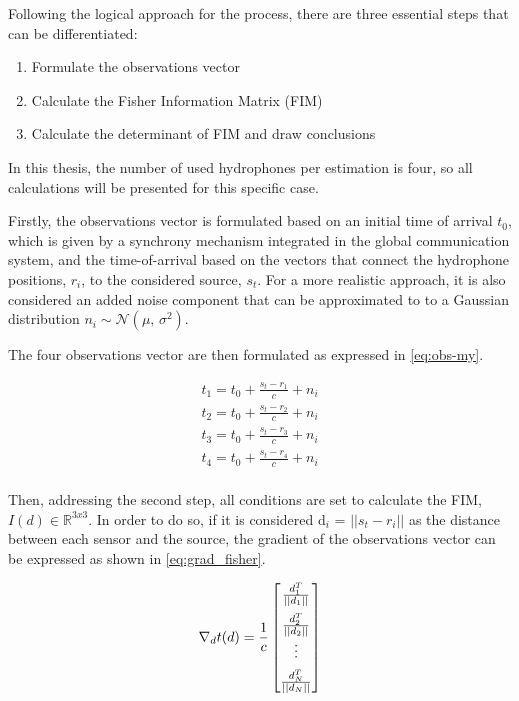 Following the logical approach for the process, there are three essential steps that can be differentiated:

\begin{enumerate}
	
	\item Formulate the observations vector
	\item Calculate the Fisher Information Matrix (FIM)
	\item Calculate the determinant of FIM and draw conclusions
	
\end{enumerate}

In this thesis, the number of used hydrophones per estimation is four, so all calculations will be presented for this specific case.

Firstly, the observations vector is formulated based on an initial time of arrival $t_0$, which is given by a synchrony mechanism integrated in the global communication system, and the time-of-arrival based on the vectors that connect the hydrophone positions, $r_i$, to the considered source, $s_t$. For a more realistic approach, it is also considered an added noise component that can be approximated to to a Gaussian distribution $n_i \sim \mathcal{N}(\mu,\,\sigma^{2})$. 

The four observations vector are then formulated as expressed in \ref{eq:obs-my}.

\begin{eqnarray}
t_1 = t_0 + \frac{s_t - r_1}{c} + n_i \\
t_2 = t_0 + \frac{s_t - r_2}{c} + n_i \\
t_3 = t_0 + \frac{s_t - r_3}{c} + n_i \\
t_4 = t_0 + \frac{s_t - r_4}{c} + n_i \\
\label{eq:obs-my}
\end{eqnarray}

Then, addressing the second step, all conditions are set to calculate the FIM,  $I(d) \in \mathbb{R}^{3x3}$. In order to do so, if it is considered d$_{i}$ = $|| s_{t} - r_{i} ||$ as the distance between each sensor and the source, the gradient of the observations vector can be expressed as shown in \ref{eq:grad_fisher}.

\begin{eqnarray}
\nabla_{d}t(d) = \frac{1}{c} 
\begin{bmatrix}
\frac{d_1^T}{||d_1||} \\ 
\addlinespace
\frac{d_2^T}{||d_2||} \\
\vdots \\
\addlinespace
\frac{d_N^T}{||d_N||}
\end{bmatrix}
\label{eq:grad_fisher}
\end{eqnarray}

